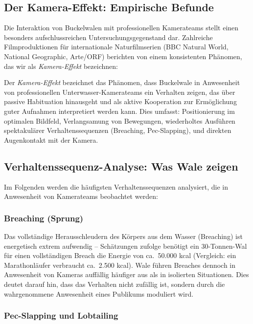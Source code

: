 ﻿\documentclass[12pt,a4paper]{article}
\theoremstyle{definition}
\theoremstyle{remark}
\begin{document}
\subsection{Der Kamera-Effekt: Empirische Befunde}

Die Interaktion von Buckelwalen mit professionellen Kamerateams stellt einen
besonders aufschlussreichen Untersuchungsgegenstand dar. Zahlreiche Filmproduktionen
für internationale Naturfilmserien (BBC Natural World, National Geographic,
Arte/ORF) berichten von einem konsistenten Phänomen, das wir als
\emph{Kamera-Effekt} bezeichnen:

Der \emph{Kamera-Effekt} bezeichnet das Phänomen, dass Buckelwale in
Anwesenheit von professionellen Unterwasser-Kamerateams ein Verhalten zeigen,
das über passive Habituation hinausgeht und als aktive Kooperation zur
Ermöglichung guter Aufnahmen interpretiert werden kann. Dies umfasst:
Positionierung im optimalen Bildfeld, Verlangsamung von Bewegungen,
wiederholtes Ausführen spektakulärer Verhaltenssequenzen (Breaching, Pec-Slapping),
und direkten Augenkontakt mit der Kamera.

\subsection{Verhaltenssequenz-Analyse: Was Wale zeigen}

Im Folgenden werden die häufigsten Verhaltenssequenzen analysiert, die in
Anwesenheit von Kamerateams beobachtet werden:

\subsubsection{Breaching (Sprung)}

Das vollständige Herausschleudern des Körpers aus dem Wasser (Breaching) ist
energetisch extrem aufwendig -- Schätzungen zufolge benötigt ein 30-Tonnen-Wal
für einen vollständigen Breach die Energie von ca.\ 50.000 kcal (Vergleich:
ein Marathonläufer verbraucht ca.\ 2.500 kcal). Wale führen Breaches dennoch
in Anwesenheit von Kameras auffällig häufiger aus als in isolierten Situationen.
Dies deutet darauf hin, dass das Verhalten nicht zufällig ist, sondern durch die
wahrgenommene Anwesenheit eines Publikums moduliert wird.

\subsubsection{Pec-Slapping und Lobtailing}
\end{document}
